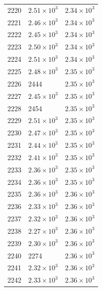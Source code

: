 \begin{table}[H]
\begin{tabular}{lll}
2220 & $\displaystyle 2.51 \times 10^{3}$ & $\displaystyle 2.34 \times 10^{3}$ \\
2221 & $\displaystyle 2.46 \times 10^{3}$ & $\displaystyle 2.34 \times 10^{3}$ \\
2222 & $\displaystyle 2.45 \times 10^{3}$ & $\displaystyle 2.34 \times 10^{3}$ \\
2223 & $\displaystyle 2.50 \times 10^{3}$ & $\displaystyle 2.34 \times 10^{3}$ \\
2224 & $\displaystyle 2.51 \times 10^{3}$ & $\displaystyle 2.34 \times 10^{3}$ \\
2225 & $\displaystyle 2.48 \times 10^{3}$ & $\displaystyle 2.35 \times 10^{3}$ \\
2226 & 2444 & $\displaystyle 2.35 \times 10^{3}$ \\
2227 & $\displaystyle 2.45 \times 10^{3}$ & $\displaystyle 2.35 \times 10^{3}$ \\
2228 & 2454 & $\displaystyle 2.35 \times 10^{3}$ \\
2229 & $\displaystyle 2.51 \times 10^{3}$ & $\displaystyle 2.35 \times 10^{3}$ \\
2230 & $\displaystyle 2.47 \times 10^{3}$ & $\displaystyle 2.35 \times 10^{3}$ \\
2231 & $\displaystyle 2.44 \times 10^{3}$ & $\displaystyle 2.35 \times 10^{3}$ \\
2232 & $\displaystyle 2.41 \times 10^{3}$ & $\displaystyle 2.35 \times 10^{3}$ \\
2233 & $\displaystyle 2.36 \times 10^{3}$ & $\displaystyle 2.35 \times 10^{3}$ \\
2234 & $\displaystyle 2.36 \times 10^{3}$ & $\displaystyle 2.35 \times 10^{3}$ \\
2235 & $\displaystyle 2.36 \times 10^{3}$ & $\displaystyle 2.36 \times 10^{3}$ \\
2236 & $\displaystyle 2.33 \times 10^{3}$ & $\displaystyle 2.36 \times 10^{3}$ \\
2237 & $\displaystyle 2.32 \times 10^{3}$ & $\displaystyle 2.36 \times 10^{3}$ \\
2238 & $\displaystyle 2.27 \times 10^{3}$ & $\displaystyle 2.36 \times 10^{3}$ \\
2239 & $\displaystyle 2.30 \times 10^{3}$ & $\displaystyle 2.36 \times 10^{3}$ \\
2240 & 2274 & $\displaystyle 2.36 \times 10^{3}$ \\
2241 & $\displaystyle 2.32 \times 10^{3}$ & $\displaystyle 2.36 \times 10^{3}$ \\
2242 & $\displaystyle 2.33 \times 10^{3}$ & $\displaystyle 2.36 \times 10^{3}$ \\

\end{tabular}
\end{table}
